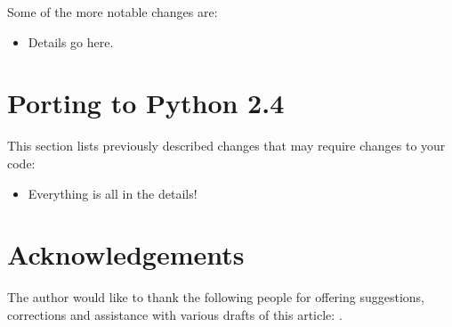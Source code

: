 \documentclass{howto}
\begin{document}
Some of the more notable changes are:

\begin{itemize}

\item Details go here.

\end{itemize}


\section{Porting to Python 2.4}

This section lists previously described changes that may require
changes to your code:

\begin{itemize}

\item Everything is all in the details!

\end{itemize}


\section{Acknowledgements \label{acks}}

The author would like to thank the following people for offering
suggestions, corrections and assistance with various drafts of this
article: .
\end{document}
